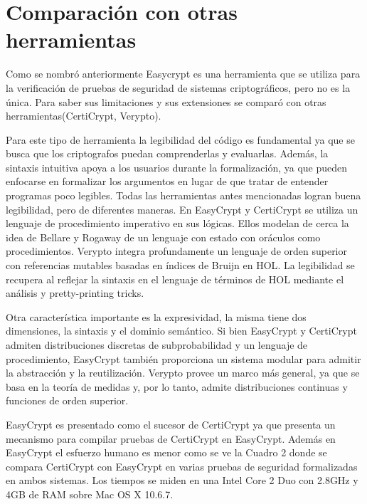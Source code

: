 \documentclass[runningheads]{llncs}
\begin{document}
\section{Comparación con otras herramientas}
Como se nombró anteriormente Easycrypt es una herramienta que se utiliza para la verificación de pruebas de seguridad de sistemas criptográficos, pero no es la única. Para saber sus limitaciones y sus extensiones se comparó con otras herramientas(CertiCrypt, Verypto).

 Para este tipo de herramienta la legibilidad del código es fundamental ya que se busca que los criptografos puedan comprenderlas y evaluarlas. Además, la sintaxis intuitiva apoya a los usuarios durante la formalización, ya que pueden enfocarse en formalizar los argumentos en lugar de que tratar de entender programas poco legibles. Todas las herramientas antes mencionadas logran buena legibilidad, pero de diferentes maneras. En EasyCrypt y CertiCrypt se utiliza un lenguaje de procedimiento imperativo en sus lógicas. Ellos modelan de cerca la idea de Bellare y Rogaway de un lenguaje con estado con oráculos como procedimientos\cite{ref_article3}. Verypto integra profundamente un lenguaje de orden superior con referencias mutables basadas en índices de Bruijn en HOL\cite{ref_article4}. La legibilidad se recupera al reflejar la sintaxis en el lenguaje de términos de HOL mediante el análisis y pretty-printing tricks.

 Otra característica importante es la expresividad, la misma tiene dos dimensiones, la sintaxis y el dominio semántico. Si bien EasyCrypt y CertiCrypt admiten distribuciones discretas de subprobabilidad y un lenguaje de procedimiento, EasyCrypt también proporciona un sistema modular para admitir la abstracción y la reutilización. Verypto provee un marco más general, ya que se basa en la teoría de medidas y, por lo tanto, admite distribuciones continuas y funciones de orden superior.

EasyCrypt es presentado como el sucesor de CertiCrypt ya que  presenta un mecanismo para compilar pruebas de CertiCrypt en EasyCrypt. Además en EasyCrypt el esfuerzo humano es menor como se ve la Cuadro 2 donde se compara CertiCrypt con EasyCrypt en varias pruebas de seguridad formalizadas en ambos sistemas. Los tiempos se miden en una Intel Core 2 Duo con 2.8GHz y 4GB de RAM sobre Mac OS X 10.6.7.
\end{document}
